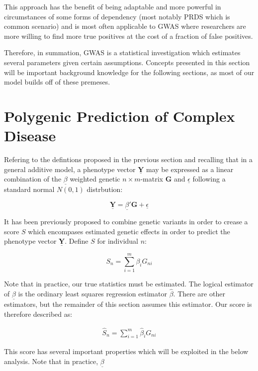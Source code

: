 This approach has the benefit of being adaptable and more powerful in circumstances of some forms of dependency (most notably \ac{PRDS} which is common scenario) and is most often applicable to \ac{GWAS} where researchers are more willing to find more true positives at the cost of a fraction of false positives.

Therefore, in summation, \ac{GWAS} is a statistical investigation which estimates several parameters given certain assumptions. Concepts presented in this section will be important background knowledge for the following sections, as most of our model builds off of these premeses. 

\section{Polygenic Prediction of Complex Disease}

Refering to the defintions proposed in the previous section and recalling that in a general additive model, a phenotype vector $\underline{\mathbf{Y}}$ may be expressed as a linear combination of the $\underline{\beta}$ weighted genetic $n \times m$-matrix $\mathbf{G}$ and $\underline{\epsilon}$ following a standard normal $N(0, 1)$ distrbution: 

$$ \underline{\mathbf{Y}} = \underline{\beta}' \mathbf{G} + \underline{\epsilon} $$

It has been previously proposed to combine genetic variants in order to crease a score $S$ which encompases estimated genetic effects in order to predict the phenotype vector $\underline{\mathbf{Y}}$. Define $S$ for individual $n$:

$$ S_n = \sum^m_{i=1} \beta_i G_{ni} $$

Note that in practice, our true statistics must be estimated. The logical estimator of $\underline{\beta}$ is the ordinary least squares regression estimator $\hat{\beta}$. There are other estimators, but the remainder of this section assumes this estimator. Our score is therefore described as:

\begin{equation} 
\label{score}
\begin{aligned}
\hat{S}_n = \sum^m_{i=1} \hat{\beta}_i G_{ni} 
\end{aligned}
\end{equation}

This score has several important properties which will be exploited in the below analysis. Note that in practice, $\underline{\beta}$

